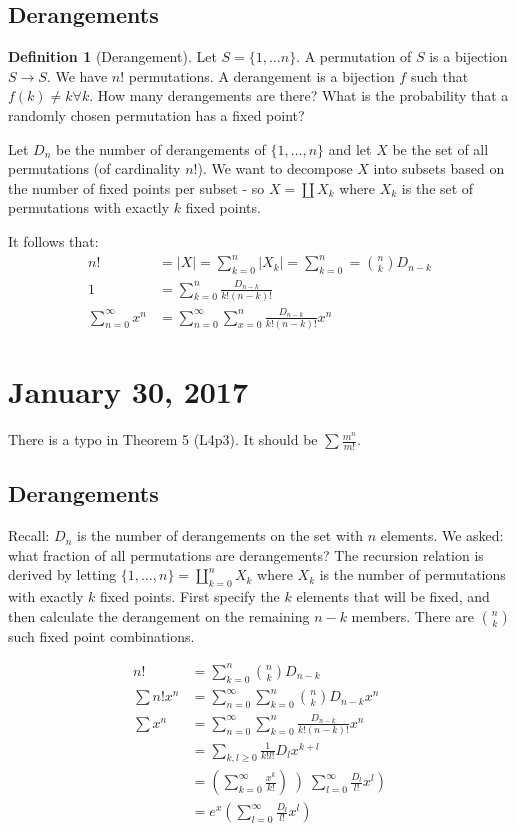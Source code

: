\documentclass[12pt]{article}
\theoremstyle{definition}
\newtheorem{defn}{Definition}
\begin{document}
\subsection{Derangements}

\begin{defn}[Derangement]
Let $S = \{1, \ldots n\}$. A permutation of $S$ is a bijection $S \rightarrow
S$. We have $n!$ permutations. A derangement is a bijection $f$ such that $f(k)
\ne k \forall k$. How many derangements are there? What is the
probability that a randomly chosen permutation has a fixed point?
\end{defn}

Let $D_n$ be the number of derangements of $\{1, \ldots, n\}$ and let $X$ be
the set of all permutations (of cardinality $n!$). We want to decompose $X$
into subsets based on the number of fixed points per subset - so $X = \coprod
X_k$ where $X_k$ is the set of permutations with exactly $k$ fixed points.

It follows that:
\begin{align*}
n! &= |X| = \sum_{k=0}^n |X_k| = \sum_{k=0}^n = {n \choose k}D_{n-k}\\
1 &= \sum_{k=0}^n \frac{D_{n-k}}{k!(n-k)!}\\
\sum_{n=0}^\infty x^n &= \sum_{n=0}^\infty \sum_{x=0}^n \frac{D_{n-k}}{k!(n-k)!}x^n
\end{align*}

\section{January 30, 2017}

There is a typo in Theorem 5 (L4p3). It should be $\sum \frac{m^n}{m!}$.

\subsection{Derangements}

Recall: $D_n$ is the number of derangements on the set with $n$ elements. We
asked: what fraction of all permutations are derangements? The recursion
relation is derived by letting $\{1, \ldots, n\} = \coprod_{k=0}^n X_k$ where
$X_k$ is the number of permutations with exactly $k$ fixed points. First
specify the $k$ elements that will be fixed, and then calculate the derangement
on the remaining $n - k$ members. There are ${ n \choose k}$ such fixed point
combinations. 

\begin{align*}
n! &= \sum_{k=0}^n {n \choose k} D_{n-k} \\
\sum n!x^n &= \sum_{n=0}^\infty\sum_{k = 0}^n {n \choose k} D_{n-k}x^n \\
\sum x^n &= \sum_{n=0}^\infty \sum_{k = 0}^n \frac{D_{n-k}}{k!(n-k)!}x^n \\
&= \sum_{k,l \ge 0} \frac{1}{k!l!} D_l x^{k + l} \\
&= \left(\sum_{k=0}^\infty \frac{x^k}{k!}\right)\left)\sum_{l=0}^\infty \frac{D_l}{l!}x^l\right) \\
&= e^x\left(\sum_{l=0}^\infty \frac{D_l}{l!}x^l\right)
\end{align*}
\end{document}
